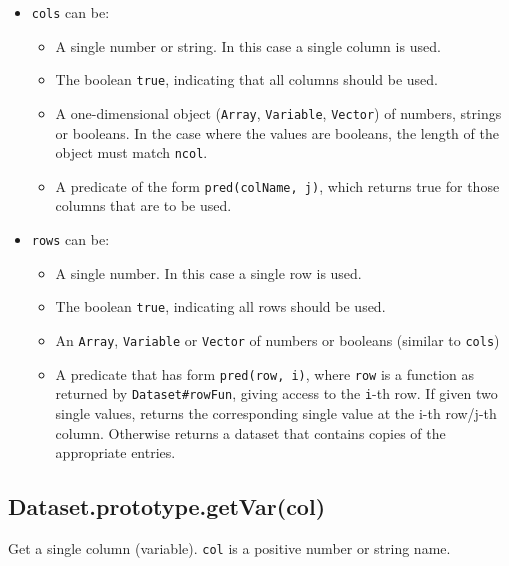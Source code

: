 \documentclass{article}
\begin{document}
\begin{itemize}

\item \texttt{cols} can be:\begin{itemize}

\item A single number or string. In this case a single column is used.

\item The boolean \texttt{true}, indicating that all columns should be used.

\item A one-dimensional object (\texttt{Array}, \texttt{Variable}, \texttt{Vector}) of numbers, strings
or booleans. In the case where the values are booleans, the length of the
object must match \texttt{ncol}.

\item A predicate of the form \texttt{pred(colName, j)}, which returns true for
those columns that are to be used.

\end{itemize}



\item \texttt{rows} can be:\begin{itemize}

\item A single number. In this case a single row is used.

\item The boolean \texttt{true}, indicating all rows should be used.

\item An \texttt{Array}, \texttt{Variable} or \texttt{Vector} of numbers or booleans (similar to \texttt{cols})

\item A predicate that has form \texttt{pred(row, i)}, where \texttt{row} is a function as returned
by \texttt{Dataset\#rowFun}, giving access to the \texttt{i}-th row.
If given two single values, returns the corresponding single value at the
i-th row/j-th column. Otherwise returns a dataset that contains copies of the
appropriate entries.

\end{itemize}



\end{itemize}

    \subsection*{Dataset.prototype.getVar(col)}
    Get a single column (variable). \texttt{col} is a positive number or string name.
\end{document}
